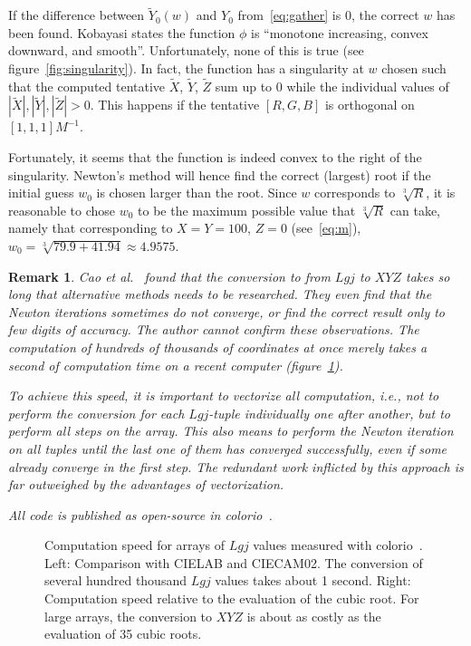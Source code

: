 \documentclass{scrartcl}
\newtheorem*{remark}{Remark}
\theoremstyle{named}
\begin{document}
If the difference between $\tilde{Y}_0(w)$ and $Y_0$ from~\eqref{eq:gather} is 0, the
correct $w$ has been found.  Kobayasi states the function $\phi$ is ``monotone
increasing, convex downward, and smooth''. Unfortunately, none of this is true (see
figure~\ref{fig:singularity}). In fact, the function has a singularity at $w$ chosen
such that the computed tentative $\tilde{X}$, $\tilde{Y}$, $\tilde{Z}$ sum up to 0 while
the individual values of $|\tilde{X}|, |\tilde{Y}|, |\tilde{Z}| > 0$. This happens if
the tentative $[R, G, B]$ is orthogonal on $[1,1,1] M^{-1}$.

Fortunately, it seems that the function is indeed convex to the right of the
singularity.  Newton's method will hence find the correct (largest) root if the initial
guess $w_0$ is chosen larger than the root. Since $w$ corresponds to $\sqrt[3]{R}$, it
is reasonable to chose $w_0$ to be the maximum possible value that $\sqrt[3]{R}$ can
take, namely that corresponding to $X=Y=100$, $Z=0$ (see~\eqref{eq:m}), $w_0=\sqrt[3]{79.9
+ 41.94}\approx 4.9575$.

\begin{remark}
  Cao et al.~\cite{cao} found that the conversion to from $Lgj$ to $XYZ$ takes so long
  that alternative methods needs to be researched. They even find that the Newton
  iterations sometimes do not converge, or find the correct result only to few digits of
  accuracy.  The author cannot confirm these observations. The computation of hundreds
  of thousands of coordinates at once merely takes a second of computation time on a
  recent computer (figure~\ref{fig:speed}).

  To achieve this speed, it is important to vectorize all computation, i.e., not to
  perform the conversion for each $Lgj$-tuple individually one after another, but to
  perform all steps on the array. This also means to perform the Newton iteration on all
  tuples until the last one of them has converged successfully, even if some already
  converge in the first step. The redundant work inflicted by this approach is far
  outweighed by the advantages of vectorization.

  All code is published as open-source in colorio~\cite{colorio}.
\end{remark}

\begin{figure}
  \centering
  \hfill
  
  \hfill
  
  \hfill
  \caption{Computation speed for arrays of $Lgj$ values measured with
  colorio~\cite{colorio}. Left: Comparison with CIELAB and CIECAM02.
  The conversion of several hundred thousand $Lgj$ values takes about 1 second. Right:
  Computation speed relative to the evaluation of the cubic root. For large arrays, the
  conversion to $XYZ$ is about as costly as the evaluation of 35 cubic roots.}\label{fig:speed}
\end{figure}

{}

\end{document}
